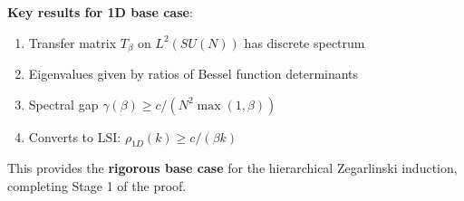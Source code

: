 \begin{summary}
\textbf{Key results for 1D base case}:
\begin{enumerate}
\item Transfer matrix $T_\beta$ on $L^2(SU(N))$ has discrete spectrum
\item Eigenvalues given by ratios of Bessel function determinants
\item Spectral gap $\gamma(\beta) \geq c/(N^2 \max(1,\beta))$
\item Converts to LSI: $\rho_{1D}(k) \geq c/(\beta k)$
\end{enumerate}

This provides the \textbf{rigorous base case} for the hierarchical Zegarlinski 
induction, completing Stage 1 of the proof.
\end{summary}





